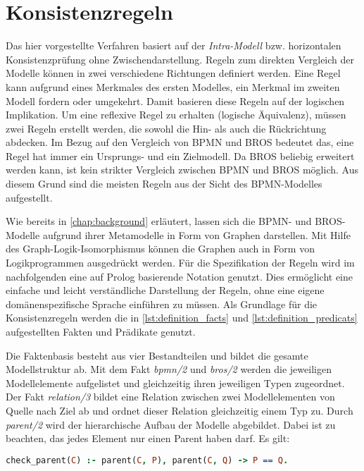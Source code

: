 \section{Konsistenzregeln} \label{sec:Konsistenzregeln}

Das hier vorgestellte Verfahren basiert auf der \emph{Intra-Modell} bzw. horizontalen Konsistenzprüfung ohne Zwischendarstellung.
Regeln zum direkten Vergleich der Modelle können in zwei verschiedene Richtungen definiert werden.
Eine Regel kann aufgrund eines Merkmales des ersten Modelles, ein Merkmal im zweiten Modell fordern oder umgekehrt.
Damit basieren diese Regeln auf der logischen Implikation.
Um eine reflexive Regel zu erhalten (logische Äquivalenz), müssen zwei Regeln erstellt werden, die sowohl die Hin- als auch die Rückrichtung abdecken.
Im Bezug auf den Vergleich von BPMN und BROS bedeutet das, eine Regel hat immer ein Ursprungs- und ein Zielmodell.
Da BROS beliebig erweitert werden kann, ist kein strikter Vergleich zwischen BPMN und BROS möglich.
Aus diesem Grund sind die meisten Regeln aus der Sicht des BPMN-Modelles aufgestellt.

Wie bereits in \cref{chap:background} erläutert, lassen sich die BPMN- und BROS-Modelle aufgrund ihrer Metamodelle in Form von Graphen darstellen.
Mit Hilfe des Graph-Logik-Isomorphismus können die Graphen auch in Form von Logikprogrammen ausgedrückt werden.
Für die Spezifikation der Regeln wird im nachfolgenden eine auf Prolog basierende Notation genutzt.
Dies ermöglicht eine einfache und leicht verständliche Darstellung der Regeln, ohne eine eigene domänenspezifische Sprache einführen zu müssen.
Als Grundlage für die Konsistenzregeln werden die in \cref{lst:definition_facts} und \cref{lst:definition_predicats} aufgestellten Fakten und Prädikate genutzt.

Die Faktenbasis besteht aus vier Bestandteilen und bildet die gesamte Modellstruktur ab.
Mit dem Fakt \emph{bpmn/2} und \emph{bros/2} werden die jeweiligen Modellelemente aufgelistet und gleichzeitig ihren jeweiligen Typen zugeordnet.
Der Fakt \emph{relation/3} bildet eine Relation zwischen zwei Modellelementen von Quelle nach Ziel ab und ordnet dieser Relation gleichzeitig einem Typ zu.
Durch \emph{parent/2} wird der hierarchische Aufbau der Modelle abgebildet.
Dabei ist zu beachten, das jedes Element nur einen Parent haben darf.
Es gilt:

\begin{lstlisting}[language=Prolog,frame=none]
check_parent(C) :- parent(C, P), parent(C, Q) -> P == Q.
\end{lstlisting}
\pagebreak
    
